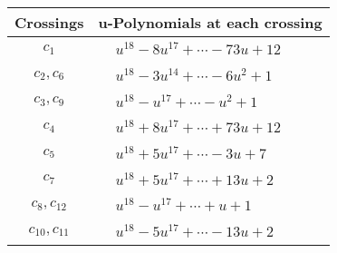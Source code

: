 \documentclass[1p]{elsarticle_modified}
\theoremstyle{definition}
\begin{document}
\begin{tabular}{m{50pt}|m{274pt}}
Crossings & \hspace{64pt}u-Polynomials at each crossing \\
\hline $$\begin{aligned}c_{1}\end{aligned}$$&$\begin{aligned}
&u^{18}-8 u^{17}+\cdots-73 u+12
\end{aligned}$\\
\hline $$\begin{aligned}c_{2},c_{6}\end{aligned}$$&$\begin{aligned}
&u^{18}-3 u^{14}+\cdots-6 u^2+1
\end{aligned}$\\
\hline $$\begin{aligned}c_{3},c_{9}\end{aligned}$$&$\begin{aligned}
&u^{18}- u^{17}+\cdots- u^2+1
\end{aligned}$\\
\hline $$\begin{aligned}c_{4}\end{aligned}$$&$\begin{aligned}
&u^{18}+8 u^{17}+\cdots+73 u+12
\end{aligned}$\\
\hline $$\begin{aligned}c_{5}\end{aligned}$$&$\begin{aligned}
&u^{18}+5 u^{17}+\cdots-3 u+7
\end{aligned}$\\
\hline $$\begin{aligned}c_{7}\end{aligned}$$&$\begin{aligned}
&u^{18}+5 u^{17}+\cdots+13 u+2
\end{aligned}$\\
\hline $$\begin{aligned}c_{8},c_{12}\end{aligned}$$&$\begin{aligned}
&u^{18}- u^{17}+\cdots+u+1
\end{aligned}$\\
\hline $$\begin{aligned}c_{10},c_{11}\end{aligned}$$&$\begin{aligned}
&u^{18}-5 u^{17}+\cdots-13 u+2
\end{aligned}$\\
\hline
\end{tabular}\\~\\
\end{document}
